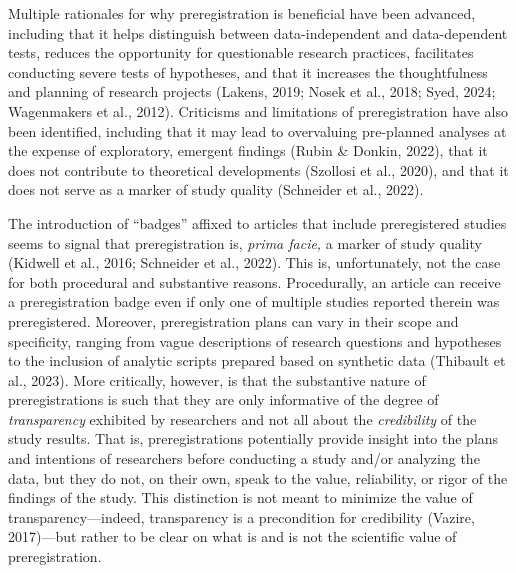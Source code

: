 \documentclass[authordate, meta]{jote-new-article}
\begin{document}
	Multiple rationales for why preregistration is beneficial have been advanced, including that it helps distinguish between data-independent and data-dependent tests, reduces the opportunity for questionable research practices, facilitates conducting severe tests of hypotheses, and that it increases the thoughtfulness and planning of research projects (Lakens, 2019; Nosek et al., 2018; Syed, 2024; Wagenmakers et al., 2012). Criticisms and limitations of preregistration have also been identified, including that it may lead to overvaluing pre-planned analyses at the expense of exploratory, emergent findings (Rubin \& Donkin, 2022), that it does not contribute to theoretical developments (Szollosi et al., 2020), and that it does not serve as a marker of study quality (Schneider et al., 2022).



	The introduction of “badges” affixed to articles that include preregistered studies seems to signal that preregistration is, \emph{prima facie,} a marker of study quality (Kidwell et al., 2016; Schneider et al., 2022). This is, unfortunately, not the case for both procedural and substantive reasons. Procedurally, an article can receive a preregistration badge even if only one of multiple studies reported therein was preregistered. Moreover, preregistration plans can vary in their scope and specificity, ranging from vague descriptions of research questions and hypotheses to the inclusion of analytic scripts prepared based on synthetic data (Thibault et al., 2023). More critically, however, is that the substantive nature of preregistrations is such that they are only informative of the degree of \emph{transparency} exhibited by researchers and not all about the \emph{credibility} of the study results. That is, preregistrations potentially provide insight into the plans and intentions of researchers before conducting a study and/or analyzing the data, but they do not, on their own, speak to the value, reliability, or rigor of the findings of the study. This distinction is not meant to minimize the value of transparency—indeed, transparency is a precondition for credibility (Vazire, 2017)—but rather to be clear on what is and is not the scientific value of preregistration.
\end{document}
